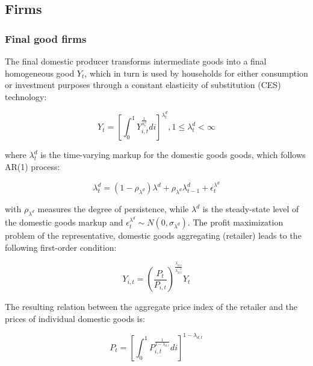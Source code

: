 \documentclass[12pt,oneside,a4paper]{article}
\begin{document}
\subsection{Firms}
\subsubsection{Final good firms}
The final domestic producer transforms intermediate goods into a final homogeneous good $Y_t$, which in turn is used by households for either consumption or investment purposes through a constant elasticity of substitution (CES) technology:

\begin{equation}
    Y_{t}=\left[\int_{0}^{1} Y_{i, t}^{ \frac{1}{\lambda_{t}^{d}}} d i\right]^{\lambda_{t}^{d}}, 1 \leq \lambda_{t}^{d}<\infty
\end{equation}

where $\lambda^{d}_{t}$ is the time-varying markup for the domestic goods goods, which follows AR(1) process:

\begin{equation}
\lambda_{t}^{d}=\left(1-\rho_{\lambda^{d}}\right) \lambda^{d}+\rho_{\lambda^{d}} \lambda_{t-1}^{d}+\epsilon_{t}^{\lambda^{d}}
\end{equation}

with $\rho_{\lambda^{d}}$ measures the degree of persistence, while $\lambda^{d}$ is the steady-state level of the domestic goods markup and $\epsilon_{t}^{\lambda^{d}} \sim N\left(0, \sigma_{\lambda^{d}} \right)$.  The profit maximization problem of the representative, domestic goods aggregating (retailer) leads to the following first-order condition:

\begin{equation}
Y_{i, t}=\left(\frac{P_{t}}{P_{i, t}}\right)^{\frac{\lambda_{d, t}}{\lambda_{d, t}^{-1}}} Y_{t}
\end{equation}

The resulting relation between the aggregate price index of the retailer and the prices of individual domestic goods is:

\begin{equation}
\label{Eq_Precos}
P_{t}=\left[\int_{0}^{1} P_{i, t}^{\frac{1}{1-\lambda_{d, t}}} d i\right]^{1-\lambda_{d, t}}
\end{equation}
\end{document}
